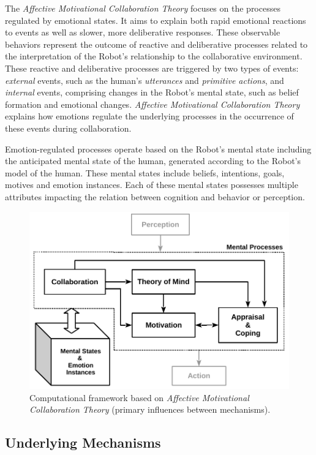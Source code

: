 The \textit{Affective Motivational Collaboration Theory} focuses on the
processes regulated by emotional states. It aims to explain both rapid emotional
reactions to events as well as slower, more deliberative responses. These
observable behaviors represent the outcome of reactive and deliberative
processes related to the interpretation of the Robot's relationship to the
collaborative environment. These reactive and deliberative processes are
triggered by two types of events: \textit{external} events, such as the human's
\textit{utterances} and \textit{primitive actions}, and \textit{internal}
events, comprising changes in the Robot's mental state, such as belief formation
and emotional changes. \textit{Affective Motivational Collaboration Theory}
explains how emotions regulate the underlying processes in the occurrence of
these events during collaboration.

Emotion-regulated processes operate based on the Robot's mental state including
the anticipated mental state of the human, generated according to the Robot's
model of the human. These mental states include beliefs, intentions, goals,
motives and emotion instances. Each of these mental states possesses multiple
attributes impacting the relation between cognition and behavior or perception.

\begin{figure}[h!]
  \includegraphics[scale=0.78]{figure/theory-general-croped.pdf}
  \caption{Computational framework based on \textit{Affective Motivational
  Collaboration Theory} (primary influences between mechanisms).}
  \label{fig:theory}
\end{figure}

\subsection{Underlying Mechanisms}
\label{sec:mechanisms}

